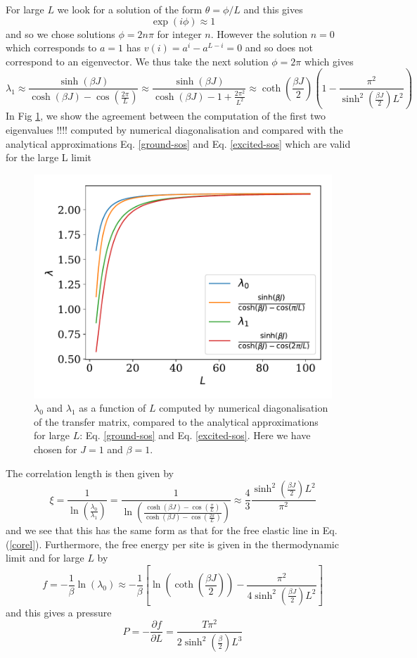 For large $L$ we look for a solution of the form $\theta=\phi/L$ and this gives
\begin{equation}
\exp(i\phi) \approx 1
\end{equation}
and so we chose solutions $\phi = 2n\pi$ for integer $n$. However the solution $n=0$ which corresponds to $a=1$ has $v(i) = a^i-a^{L-i} =0$ and so does not correspond to an eigenvector. We thus take the next solution $\phi = 2\pi$ which gives
\begin{equation}
\lambda_1 \approx \frac{\sinh(\beta J)}{\cosh(\beta J) - \cos(\frac{2\pi}{L})} \approx \frac{\sinh(\beta J)}{\cosh(\beta J) - 1+ \frac{2\pi^2}{L^2}}\approx \coth(\frac{\beta J}{2})(1 - \frac{\pi^2}{\sinh^2(\frac{\beta J}{2}) L^2})
\label{excited-sos}
\end{equation}
In Fig \ref{large-l-limit}, we show the agreement between the computation of the first two eigenvalues !!!! computed by numerical diagonalisation and compared with the analytical approximations Eq. \eqref{ground-sos} and Eq. \eqref{excited-sos} which are valid for the large L limit
\begin{figure}
\centering
\includegraphics[width=0.7\linewidth]{finite-size/null_deanJ.pdf}
\caption{$\lambda_0$ and $\lambda_1$ as a function of $L$ computed by numerical diagonalisation of the transfer matrix, compared to the analytical approximations for large $L$: Eq. \eqref{ground-sos} and Eq. \eqref{excited-sos}. Here we have chosen  for $J=1$ and $\beta=1$.}
\label{large-l-limit} 
\end{figure}

The correlation length is then given by
\begin{equation}
\xi =\frac{1}{\ln(\frac{\lambda_0}{\lambda_1})} = \frac{1}{\ln(\frac{\cosh(\beta J) - \cos(\frac{\pi}{L})}{\cosh(\beta J) - \cos(\frac{2\pi}{L})})}\approx \frac{4}{3}\frac{\sinh^2(\frac{\beta J}{2})L^2}{\pi^2}
\end{equation}
and we see that this has the same form as that for the free elastic line in Eq. (\ref{corel}).
Furthermore, the free energy per site is given in the thermodynamic limit and for large $L$ by
\begin{equation}
f=-\frac{1}{\beta}\ln(\lambda_0) \approx -\frac{1}{\beta}\left[ \ln(\coth(\frac{\beta J}{2}))- \frac{\pi^2}{4\sinh^2(\frac{\beta J}{2}) L^2}\right]
\end{equation}
and this gives a pressure
\begin{equation}
P= -\frac{\partial f}{\partial L}= \frac{T\pi^2}{2 \sinh^2(\frac{\beta}{2}) L^3}
\end{equation}


